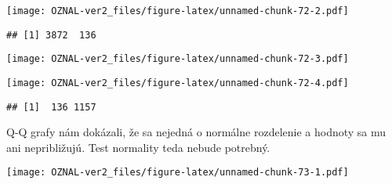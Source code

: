 \documentclass[
]{article}
\newenvironment{Shaded}{\begin{snugshade}}{\end{snugshade}}
\newcommand{\AttributeTok}[1]{\textcolor[rgb]{0.77,0.63,0.00}{#1}}
\newcommand{\ConstantTok}[1]{\textcolor[rgb]{0.00,0.00,0.00}{#1}}
\newcommand{\DecValTok}[1]{\textcolor[rgb]{0.00,0.00,0.81}{#1}}
\newcommand{\FunctionTok}[1]{\textcolor[rgb]{0.00,0.00,0.00}{#1}}
\newcommand{\NormalTok}[1]{#1}
\newcommand{\SpecialCharTok}[1]{\textcolor[rgb]{0.00,0.00,0.00}{#1}}
\newcommand{\StringTok}[1]{\textcolor[rgb]{0.31,0.60,0.02}{#1}}
\begin{document}
\texttt{[image: OZNAL-ver2\_files/figure-latex/unnamed-chunk-72-2.pdf]}

\begin{verbatim}
## [1] 3872  136
\end{verbatim}

\begin{Shaded}
\end{Shaded}

\texttt{[image: OZNAL-ver2\_files/figure-latex/unnamed-chunk-72-3.pdf]}

\begin{Shaded}
\end{Shaded}

\texttt{[image: OZNAL-ver2\_files/figure-latex/unnamed-chunk-72-4.pdf]}

\begin{verbatim}
## [1]  136 1157
\end{verbatim}

Q-Q grafy nám dokázali, že sa nejedná o normálne rozdelenie a hodnoty sa
mu ani nepribližujú. Test normality teda nebude potrebný.

\begin{Shaded}
\end{Shaded}

\texttt{[image: OZNAL-ver2\_files/figure-latex/unnamed-chunk-73-1.pdf]}

\begin{Shaded}
\end{Shaded}
\end{document}
